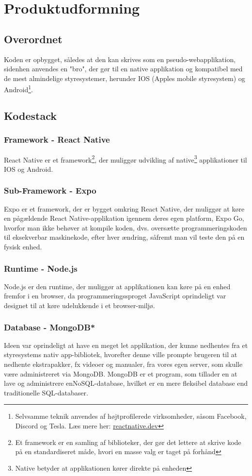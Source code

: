 \section{Produktudformning}
\subsection{Overordnet}
Koden er opbygget, således at den kan skrives som en pseudo-webapplikation, sidenhen anvendes en "bro", der gør til en native applikation og kompatibel med de mest almindelige styresystemer, herunder IOS (Apples mobile styresystem) og Android\footnote{Selvsamme teknik anvendes af højtprofilerede virksomheder, såsom Facebook, Discord og Tesla. Læs mere her: \href{https://reactnative.dev/}{reactnative.dev}}.

\subsection{Kodestack}
\subsubsection{Framework - React Native}
React Native er et framework\footnote{Et framework er en samling af biblioteker, der gør det lettere at skrive kode på en standardiseret måde, hvori en masse valg er taget på forhånd}, der muliggør udvikling af native\footnote{Native betyder at applikationen kører direkte på enheden} applikationer til IOS og Android. 
\subsubsection{Sub-Framework - Expo}
Expo er et framework, der er bygget omkring React Native, der muliggør at køre en pågældende React Native-applikation igennem deres egen platform, Expo Go, hvorfor man ikke behøver at kompile koden, dvs. oversætte programmeringskoden til eksekverbar maskinekode, efter hver ændring, såfremt man vil teste den på en fysisk enhed. 
\subsubsection{Runtime - Node.js}
Node.js er den runtime, der muliggør at applikationen kan køre på en enhed fremfor i en browser, da programmeringssproget JavaScript oprindeligt var designet til at køre udelukkende i et browser-miljø. 
\subsubsection{Database - MongoDB*}
Ideen var oprindeligt at have en meget let applikation, der kunne nedhentes fra et styresystems nativ app-bibliotek, hvorefter denne ville prompte brugeren til at nedhente ekstrapakker, fx videoer og manualer, fra vores egen server, som skulle være administreret via MongoDB. MongoDB er et program, som tillader en at lave og administrere enNoSQL-database, hvilket er en mere fleksibel database end traditionelle SQL-databaser. 
